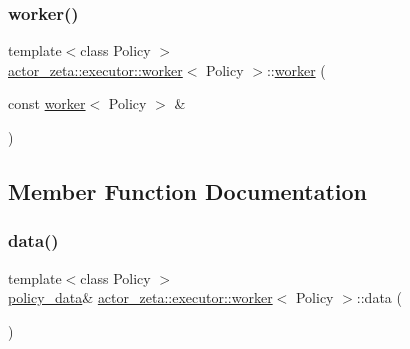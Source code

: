 \mbox{\label{classactor__zeta_1_1executor_1_1worker_a67c327dc2d357864799117c8358a736e}} 
\subsubsection{\texorpdfstring{worker()}{worker()}\hspace{0.1cm}{\footnotesize\ttfamily [2/2]}}
{\footnotesize\ttfamily template$<$class Policy $>$ \\
\hyperlink{classactor__zeta_1_1executor_1_1worker}{actor\+\_\+zeta\+::executor\+::worker}$<$ Policy $>$\+::\hyperlink{classactor__zeta_1_1executor_1_1worker}{worker} (\begin{DoxyParamCaption}\item[{const \hyperlink{classactor__zeta_1_1executor_1_1worker}{worker}$<$ Policy $>$ \&}]{ }\end{DoxyParamCaption})\hspace{0.3cm}{\ttfamily [delete]}}



\subsection{Member Function Documentation}
\mbox{\label{classactor__zeta_1_1executor_1_1worker_a2b687c0dde52737dd2c4701117d6abb1}} 
\subsubsection{\texorpdfstring{data()}{data()}}
{\footnotesize\ttfamily template$<$class Policy $>$ \\
\hyperlink{classactor__zeta_1_1executor_1_1worker_ad8f39b0132441963ede8c1e8435aebb2}{policy\+\_\+data}\& \hyperlink{classactor__zeta_1_1executor_1_1worker}{actor\+\_\+zeta\+::executor\+::worker}$<$ Policy $>$\+::data (\begin{DoxyParamCaption}{ }\end{DoxyParamCaption})\hspace{0.3cm}{\ttfamily [inline]}}

